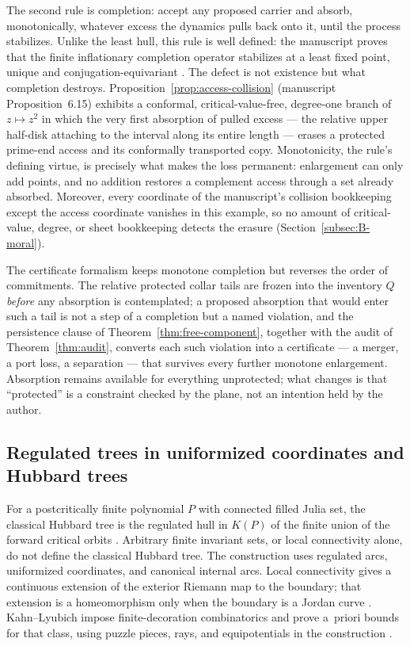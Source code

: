 \documentclass[11pt,reqno]{amsart}
\theoremstyle{definition}
\theoremstyle{remark}
\begin{document}
The second rule is completion: accept any proposed carrier and absorb,
monotonically, whatever excess the dynamics pulls back onto it, until the
process stabilizes.  Unlike the least hull, this rule is well defined:
the manuscript proves that the finite inflationary completion operator
stabilizes at a least fixed point, unique and conjugation-equivariant
\cite[Theorem~6.14]{MWman}.  The defect is not existence but what
completion destroys.  Proposition~\ref{prop:access-collision} (manuscript
Proposition~6.15) exhibits a conformal, critical-value-free, degree-one
branch of $z\mapsto z^2$ in which the very first absorption of pulled
excess --- the relative upper half-disk attaching to the interval along
its entire length --- erases a protected prime-end access and its
conformally transported copy.  Monotonicity, the rule's defining virtue,
is precisely what makes the loss permanent: enlargement can only add
points, and no addition restores a complement access through a set
already absorbed.  Moreover, every coordinate of the manuscript's
collision bookkeeping except the access coordinate vanishes in this
example, so no amount of critical-value, degree, or sheet bookkeeping
detects the erasure (Section~\ref{subsec:B-moral}).

The certificate formalism keeps monotone completion but reverses the
order of commitments.  The relative protected collar tails are frozen into the
inventory $Q$ \emph{before} any absorption is contemplated; a proposed
absorption that would enter such a tail is not a step of a completion
but a named violation, and the persistence clause of
Theorem~\ref{thm:free-component}, together with the audit of
Theorem~\ref{thm:audit}, converts each such violation into a certificate
--- a merger, a port loss, a separation --- that survives every further
monotone enlargement.  Absorption remains available for everything
unprotected; what changes is that ``protected'' is a constraint checked
by the plane, not an intention held by the author.

\subsection[Regulated and Hubbard trees]
{Regulated trees in uniformized coordinates and Hubbard trees}
\label{subsec:A-comp-trees}

For a postcritically finite polynomial $P$ with connected filled Julia
set, the classical Hubbard tree is the regulated hull in $K(P)$ of the
finite union of the forward critical orbits \cite{DHOrsay}.  Arbitrary finite
invariant sets, or local connectivity alone, do not define the classical
Hubbard tree.  The construction uses regulated arcs, uniformized
coordinates, and canonical internal arcs.  Local connectivity gives a
continuous extension of the exterior Riemann map to the boundary; that
extension is a homeomorphism only when the boundary is a Jordan curve
\cite{DHOrsay,Pom92}.  Kahn--Lyubich impose finite-decoration combinatorics
and prove a~priori bounds for that class, using puzzle pieces, rays, and
equipotentials in the construction \cite{KL08}.
\end{document}
